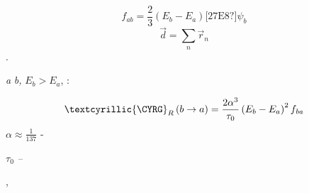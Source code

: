 \documentclass[a4paper]{article}
\begin{document}
\begin{equation*}
f_{\mathit{ab}}=\frac 2 3\left(E_b-E_a\right)\text{[27E8?]}\psi _b
\end{equation*}
\begin{equation*}
\overrightarrow d=\sum _n\overrightarrow r_n
\end{equation*}
{\CYRS}{\cyru}{\cyrm}{\cyrm}{\cyri}{\cyrr}{\cyro}{\cyrv}{\cyra}{\cyrn}{\cyri}{\cyre}
{\cyrp}{\cyrr}{\cyro}{\cyri}{\cyrz}{\cyrv}{\cyro}{\cyrd}{\cyri}{\cyrt}{\cyrs}{\cyrya} {\cyrp}{\cyro}
{\cyrv}{\cyrs}{\cyre}{\cyrm} {\cyrerev}{\cyrl}{\cyre}{\cyrk}{\cyrt}{\cyrr}{\cyro}{\cyrn}{\cyra}{\cyrm}.

{\CYRV}{\cyre}{\cyrr}{\cyro}{\cyrya}{\cyrt}{\cyrn}{\cyro}{\cyrs}{\cyrt}{\cyrsftsn}
{\cyrp}{\cyre}{\cyrr}{\cyre}{\cyrh}{\cyro}{\cyrd}{\cyra} \foreignlanguage{english}{\textit{a}} {\cyrv}
{\cyrs}{\cyro}{\cyrs}{\cyrt}{\cyro}{\cyrya}{\cyrn}{\cyri}{\cyre} \foreignlanguage{english}{\textit{b}}\textit{,}
{\cyrd}{\cyrl}{\cyrya} {\cyrk}{\cyro}{\cyrt}{\cyro}{\cyrr}{\cyrery}{\cyrh}  $E_b>E_a$,
{\cyro}{\cyrp}{\cyrr}{\cyre}{\cyrd}{\cyre}{\cyrl}{\cyrya}{\cyre}{\cyrt}{\cyrs}{\cyrya}
{\cyrch}{\cyre}{\cyrr}{\cyre}{\cyrz} {\cyrs}{\cyri}{\cyrl}{\cyru}
{\cyro}{\cyrs}{\cyrc}{\cyri}{\cyrl}{\cyrl}{\cyrya}{\cyrt}{\cyro}{\cyrr}{\cyra} {\cyrt}{\cyra}{\cyrk}{\cyri}{\cyrm}
{\cyro}{\cyrb}{\cyrr}{\cyra}{\cyrz}{\cyro}{\cyrm}:

\begin{equation*}
\text{\textcyrillic{{\CYRG}}}_R\left(b\rightarrow a\right)=\frac{2\alpha ^3}{\tau
_0}\left(E_b-E_a\right)^2f_{\mathit{ba}}
\end{equation*}
 $\alpha {\approx}\frac 1{137}$\textit{ }{}- {\cyrp}{\cyro}{\cyrs}{\cyrt}{\cyro}{\cyrya}{\cyrn}{\cyrn}{\cyra}{\cyrya}
{\cyrt}{\cyro}{\cyrn}{\cyrk}{\cyro}{\cyrishrt} {\cyrs}{\cyrt}{\cyrr}{\cyru}{\cyrk}{\cyrt}{\cyru}{\cyrr}{\cyrery}

 $\tau _0$\textit{ -- }{\cyra}{\cyrt}{\cyro}{\cyrm}{\cyrn}{\cyra}{\cyrya}
{\cyre}{\cyrd}{\cyri}{\cyrn}{\cyri}{\cyrc}{\cyra} {\cyrv}{\cyrr}{\cyre}{\cyrm}{\cyre}{\cyrn}{\cyri}

{\CYRT}{\cyra}{\cyrk} {\cyrk}{\cyra}{\cyrk} {\cyrv}{\cyro}{\cyrl}{\cyrn}{\cyro}{\cyrv}{\cyra}{\cyrya}
{\cyrf}{\cyru}{\cyrn}{\cyrk}{\cyrc}{\cyri}{\cyrya}
{\cyrr}{\cyra}{\cyrz}{\cyrd}{\cyre}{\cyrl}{\cyrya}{\cyre}{\cyrt}{\cyrs}{\cyrya} {\cyrn}{\cyra}
{\cyrr}{\cyra}{\cyrd}{\cyri}{\cyra}{\cyrl}{\cyrsftsn}{\cyrn}{\cyru}{\cyryu} {\cyri}
{\cyru}{\cyrg}{\cyrl}{\cyro}{\cyrv}{\cyru}{\cyryu} {\cyrch}{\cyra}{\cyrs}{\cyrt}{\cyri}, {\cyrm}{\cyrery}
{\cyrm}{\cyro}{\cyrzh}{\cyre}{\cyrm} {\cyrs}{\cyro}{\cyrs}{\cyrch}{\cyri}{\cyrt}{\cyra}{\cyrt}{\cyrsftsn}
{\cyro}{\cyrt}{\cyrd}{\cyre}{\cyrl}{\cyrsftsn}{\cyrn}{\cyro} {\cyru}{\cyrg}{\cyrl}{\cyro}{\cyrv}{\cyro}{\cyrishrt}
{\cyri} {\cyrr}{\cyra}{\cyrd}{\cyri}{\cyra}{\cyrl}{\cyrsftsn}{\cyrn}{\cyrery}{\cyrishrt}
{\cyrm}{\cyra}{\cyrt}{\cyrr}{\cyri}{\cyrch}{\cyrn}{\cyrery}{\cyrishrt}
{\cyrerev}{\cyrl}{\cyre}{\cyrm}{\cyre}{\cyrn}{\cyrt}{\cyrery}
\end{document}
